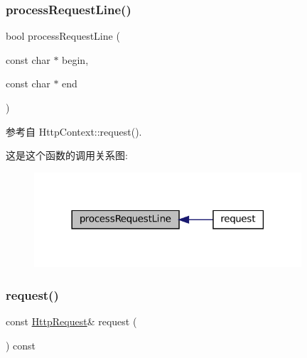 \subsubsection{\texorpdfstring{process\+Request\+Line()}{processRequestLine()}}
{\footnotesize\ttfamily bool process\+Request\+Line (\begin{DoxyParamCaption}\item[{const char $\ast$}]{begin,  }\item[{const char $\ast$}]{end }\end{DoxyParamCaption})\hspace{0.3cm}{\ttfamily [private]}}



参考自 Http\+Context\+::request().

这是这个函数的调用关系图\+:
\nopagebreak
\begin{figure}[H]
\begin{center}
\leavevmode
\includegraphics[width=282pt]{classmuduo_1_1net_1_1HttpContext_a821b8727fba9b866e5d04d766a82e715_icgraph}
\end{center}
\end{figure}
\mbox{\label{classmuduo_1_1net_1_1HttpContext_adb9c927b9a9aef020981b888ee01c166}} 
\subsubsection{\texorpdfstring{request()}{request()}\hspace{0.1cm}{\footnotesize\ttfamily [1/2]}}
{\footnotesize\ttfamily const \hyperlink{classmuduo_1_1net_1_1HttpRequest}{Http\+Request}\& request (\begin{DoxyParamCaption}{ }\end{DoxyParamCaption}) const\hspace{0.3cm}{\ttfamily [inline]}}



